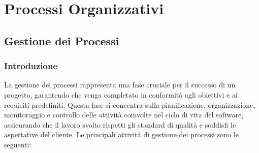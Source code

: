\section{Processi Organizzativi}

\subsection{Gestione dei Processi}
\subsubsection{Introduzione}

La gestione dei processi rappresenta una fase cruciale per il successo di un progetto, garantendo che venga completato in conformità agli obiettivi e ai requisiti predefiniti. Questa fase si concentra sulla pianificazione, organizzazione, monitoraggio e controllo delle attività coinvolte nel ciclo di vita del software, assicurando che il lavoro svolto rispetti gli standard di qualità e soddisfi le aspettative del cliente. Le principali attività di gestione dei processi sono le seguenti:

